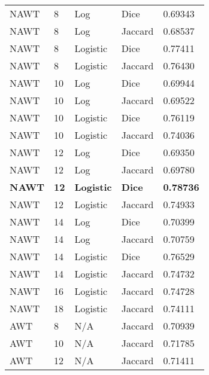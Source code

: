 \documentclass{article}
\begin{document}
\begin{center}
	\scriptsize
    
    \tablelasttail{\hline}

      \begin{supertabular}{| l | l | l | l | l |}
            NAWT & 8 & Log & Dice & 0.69343 \\
            NAWT & 8 & Log & Jaccard & 0.68537 \\
            NAWT & 8 & Logistic & Dice & 0.77411 \\
            NAWT & 8 & Logistic & Jaccard & 0.76430 \\
            NAWT & 10 & Log & Dice & 0.69944 \\
            NAWT & 10 & Log & Jaccard & 0.69522 \\
            NAWT & 10 & Logistic & Dice & 0.76119 \\
            NAWT & 10 & Logistic & Jaccard & 0.74036 \\
            NAWT & 12 & Log & Dice & 0.69350 \\
            NAWT & 12 & Log & Jaccard & 0.69780 \\
            \textbf{NAWT} & \textbf{12} & \textbf{Logistic} & \textbf{Dice} & \textbf{0.78736} \\
            NAWT & 12 & Logistic & Jaccard & 0.74933 \\
            NAWT & 14 & Log & Dice & 0.70399 \\
            NAWT & 14 & Log & Jaccard & 0.70759 \\
            NAWT & 14 & Logistic & Dice & 0.76529 \\
            NAWT & 14 & Logistic & Jaccard & 0.74732 \\
            NAWT & 16 & Logistic & Jaccard & 0.74728 \\
            NAWT & 18 & Logistic & Jaccard & 0.74111 \\
            AWT & 8 & N/A & Jaccard & 0.70939 \\
            AWT & 10 & N/A & Jaccard & 0.71785 \\
            AWT & 12 & N/A & Jaccard & 0.71411 \\

\end{supertabular}
\end{center}
\end{document}
